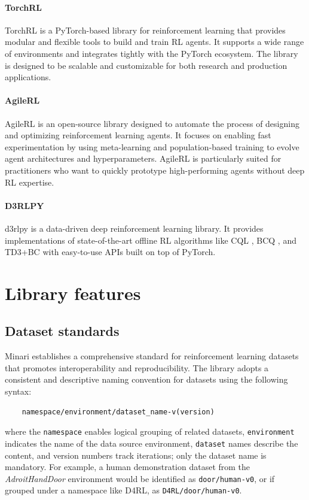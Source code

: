 \documentclass{article}
\begin{document}
\paragraph{TorchRL} TorchRL \cite{torchrl} is a PyTorch-based library for reinforcement learning that provides modular and flexible tools to build and train RL agents. It supports a wide range of environments and integrates tightly with the PyTorch ecosystem. The library is designed to be scalable and customizable for both research and production applications.

\paragraph{AgileRL}
AgileRL \cite{agilerl} is an open-source library designed to automate the process of designing and optimizing reinforcement learning agents. It focuses on enabling fast experimentation by using meta-learning and population-based training to evolve agent architectures and hyperparameters. AgileRL is particularly suited for practitioners who want to quickly prototype high-performing agents without deep RL expertise.

\paragraph{D3RLPY}
d3rlpy \cite{d3rlpy} is a data-driven deep reinforcement learning library. It provides implementations of state-of-the-art offline RL algorithms like CQL \cite{CQL}, BCQ \cite{BCQ}, and TD3+BC \cite{TD3+BC} with easy-to-use APIs built on top of PyTorch.

\section{Library features}
\label{sec:library_features}

\subsection{Dataset standards}
Minari establishes a comprehensive standard for reinforcement learning datasets that promotes interoperability and reproducibility. The library adopts a consistent and descriptive naming convention for datasets using the following syntax:
\begin{verbatim}
    namespace/environment/dataset_name-v(version)
\end{verbatim}
where the \verb|namespace| enables logical grouping of related datasets, \verb|environment| indicates the name of the data source environment, \verb|dataset| names describe the content, and version numbers track iterations; only the dataset name is mandatory. For example, a human demonstration dataset from the \textit{AdroitHandDoor} environment would be identified as \verb|door/human-v0|, or if grouped under a namespace like D4RL, as \verb|D4RL/door/human-v0|.
\end{document}
